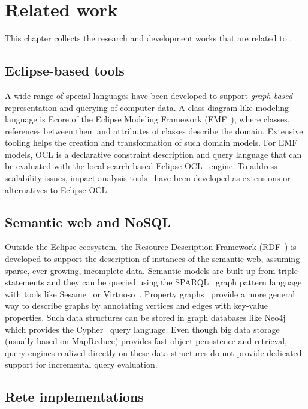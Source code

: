 \chapter{Related work}
\label{chap:related-work}

This chapter collects the research and development works that are related to \iqd{}.

\section{Eclipse-based tools}

A wide range of special languages have been developed to support \emph{graph based} representation and querying of computer data. A class-diagram like modeling language is Ecore of the Eclipse Modeling Framework (EMF~\cite{EMF}), where classes, references between them and attributes of classes describe the domain. Extensive tooling helps the creation and transformation of such domain models. For EMF models, OCL is a declarative constraint description and query language that can be evaluated with the local-search based Eclipse OCL~\cite{EclipseOCL} engine. To address scalability issues, impact analysis tools~\cite{OCLIA} have been developed as extensions or alternatives to Eclipse OCL.

\section{Semantic web and NoSQL}

Outside the Eclipse ecosystem, the Resource Description Framework (RDF~\cite{website:rdf_standard}) is developed to support the description of instances of the semantic web, assuming sparse, ever-growing, incomplete data. Semantic models are built up from triple statements and they can be queried using the SPARQL~\cite{SPARQL} graph pattern language with tools like Sesame~\cite{sesame} or Virtuoso~\cite{openvirtuoso}. Property graphs~\cite{DBLP:journals/corr/abs-1006-2361} provide a more general way to describe graphs by annotating vertices and edges with key-value properties. Such data structures can be stored in graph databases like Neo4j~\cite{neo4j} which provides the Cypher~\cite{cypher} query language. Even though big data storage (usually based on MapReduce) provides fast object persistence and retrieval, query engines realized directly on these data structures do not provide dedicated support for incremental query evaluation. 

\section{Rete implementations}

